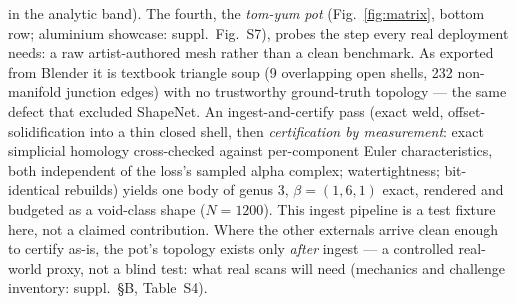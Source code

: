 in the analytic band).
The fourth, the \emph{tom-yum pot} (Fig.~\ref{fig:matrix}, bottom row;
aluminium showcase: suppl.\ Fig.~S7), probes the step
every real deployment needs: a raw artist-authored mesh
rather than a clean benchmark. As exported from Blender it is textbook
triangle soup (9 overlapping open shells, 232 non-manifold junction
edges) with no trustworthy ground-truth topology --- the same defect
that excluded ShapeNet. An ingest-and-certify pass (exact weld,
offset-solidification into a thin closed shell, then \emph{certification
by measurement}: exact simplicial homology cross-checked against
per-component Euler characteristics, both independent of the loss's
sampled alpha complex; watertightness; bit-identical rebuilds) yields
one body of genus 3, $\beta{=}(1,6,1)$ exact,
rendered and budgeted as a void-class shape ($N{=}1200$). This ingest
pipeline is a test fixture here, not a claimed contribution. Where the
other externals arrive clean enough to certify as-is, the pot's
topology exists only \emph{after} ingest --- a controlled real-world
proxy, not a blind test: what real scans will need (mechanics and
challenge inventory: suppl.\ \S B, Table~S4).
